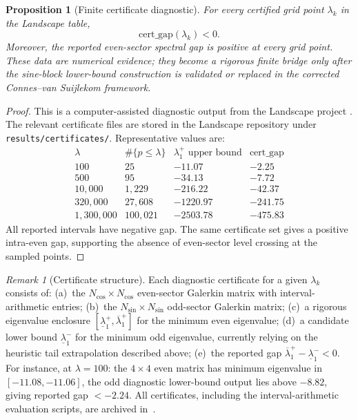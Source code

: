 \documentclass[11pt,a4paper]{article}
\newtheorem{proposition}[proposition]{Proposition}
\theoremstyle{remark}
\newtheorem{remark}[remark]{Remark}
\theoremstyle{plain}
\begin{document}
\begin{proposition}[Finite certificate diagnostic]
\label{prop:finite-certificates}
For every certified grid point $\lambda_k$ in the Landscape table,
\[
  \mathrm{cert\_gap}(\lambda_k)<0.
\]
Moreover, the reported even-sector spectral gap is positive at every grid
point. These data are numerical evidence; they become a rigorous finite bridge
only after the sine-block lower-bound construction is validated or replaced in
the corrected Connes--van Suijlekom framework.
\end{proposition}

\begin{proof}
This is a computer-assisted diagnostic output from the Landscape project
\cite{GeigerLandscapeII}. The relevant certificate files are stored in the Landscape
repository under \texttt{results/certificates/}. Representative values are:
\[
\begin{array}{r|r|r|r}
\lambda & \#\{p\leq\lambda\} & \lambda_1^+ \text{ upper bound} &
\mathrm{cert\_gap}\\\hline
100 & 25 & -11.07 & -2.25\\
500 & 95 & -34.13 & -7.72\\
10{,}000 & 1{,}229 & -216.22 & -42.37\\
320{,}000 & 27{,}608 & -1220.97 & -241.75\\
1{,}300{,}000 & 100{,}021 & -2503.78 & -475.83
\end{array}
\]
All reported intervals have negative gap. The same certificate set gives a
positive intra-even gap, supporting the absence of even-sector level crossing at
the sampled points.
\end{proof}

\begin{remark}[Certificate structure]
\label{rem:cert-structure}
Each diagnostic certificate for a given $\lambda_k$ consists of:
(a)~the $N_{\cos}\times N_{\cos}$ even-sector Galerkin matrix with interval-arithmetic
entries;
(b)~the $N_{\sin}\times N_{\sin}$ odd-sector Galerkin matrix;
(c)~a rigorous eigenvalue enclosure
$[\underline\lambda_1^+,\overline\lambda_1^+]$ for the minimum even eigenvalue;
(d)~a candidate lower bound $\underline\lambda_1^-$ for the minimum odd eigenvalue,
currently relying on the heuristic tail extrapolation described above;
(e)~the reported gap $\overline\lambda_1^+-\underline\lambda_1^-<0$.
For instance, at $\lambda=100$: the $4\times 4$ even matrix has minimum eigenvalue
in $[-11.08,-11.06]$, the odd diagnostic lower-bound output lies above $-8.82$,
giving reported gap $<-2.24$. All certificates, including the interval-arithmetic evaluation scripts,
are archived in~\cite{GeigerLandscapeII}.
\end{remark}
\end{document}
